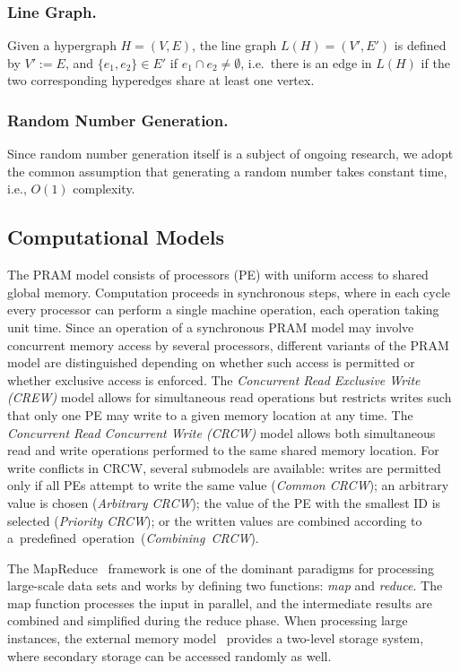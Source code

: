 \documentclass[runningheads]{llncs}
\begin{document}
 \subsubsection{Line Graph.}
Given a hypergraph $H = (V, E)$, the line graph $L(H) = (V', E')$ is defined by $V' := E$, and $\{e_1, e_2\} \in E'$ if $e_1 \cap e_2 \neq \emptyset$, i.e.~there is an edge in $L(H)$ if the two corresponding hyperedges share at least one vertex.
\subsubsection{Random Number Generation.}
Since random number generation itself is a subject of ongoing research, we adopt the common assumption that generating a random number takes constant time, i.e., $O(1)$ complexity.



\subsection{Computational Models}

The PRAM model consists of processors (PE) with uniform access to shared global memory.
Computation proceeds in synchronous steps, where in each cycle every processor can perform a single machine operation, each operation taking unit time. Since an operation of a synchronous PRAM model may involve concurrent memory access by several processors, different variants of the PRAM model are distinguished depending on whether such access is permitted or whether exclusive access is enforced. The \emph{Concurrent Read Exclusive Write (CREW)} model allows for simultaneous read operations but restricts writes such that only one PE may write to a given memory location at any time. The \emph{Concurrent Read Concurrent Write (CRCW)} model allows both simultaneous read and write operations performed to the same shared memory location. For write conflicts in CRCW, several submodels are available: writes are permitted only if all PEs attempt to write the same value (\emph{Common CRCW}); an arbitrary value is chosen (\emph{Arbitrary CRCW}); the value of the PE with the smallest ID is selected (\emph{Priority CRCW}); or the written values are combined according to \hbox{a predefined operation (\emph{Combining CRCW}).}

The MapReduce~\cite{dean2008mapreduce} framework is one of the dominant paradigms for processing large-scale data sets and works by defining two functions: \emph{map} and \emph{reduce}. The map function processes the input in parallel, and the intermediate results are combined and simplified during the reduce phase.
When processing large instances, the external memory model~\cite{vitter1994algorithms} provides a two-level storage system, where secondary storage can be accessed randomly as well.
\end{document}
